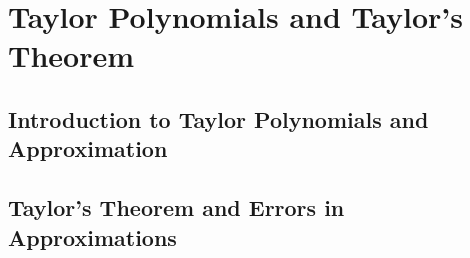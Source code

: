 \chapter{Taylor Polynomials and Taylor's Theorem}
\section{Introduction to Taylor Polynomials and Approximation}
\section{Taylor’s Theorem and Errors in Approximations}